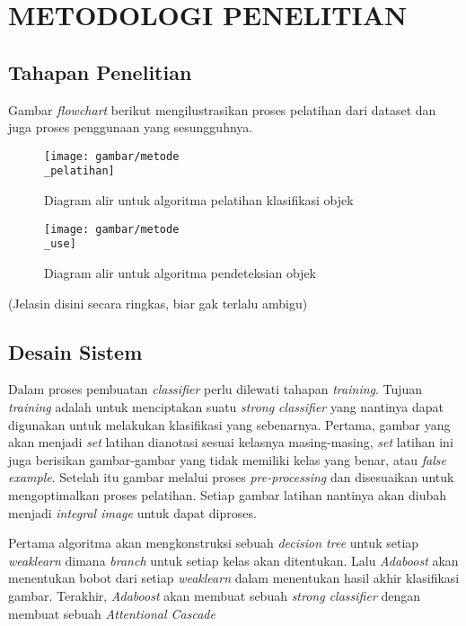 
\chapter{METODOLOGI PENELITIAN}

\section{Tahapan Penelitian}

Gambar \textit{flowchart} berikut mengilustrasikan proses pelatihan 
 dari dataset dan juga proses penggunaan yang sesungguhnya.

\begin{figure}[H]
  \centering{}
	\texttt{[image: gambar/metode\\\_pelatihan]}
  \caption{Diagram alir untuk algoritma pelatihan klasifikasi objek}
\end{figure}

\begin{figure}[H]
  \centering{}
	\texttt{[image: gambar/metode\\\_use]}
  \caption{Diagram alir untuk algoritma pendeteksian objek}
\end{figure}

(Jelasin disini secara ringkas, biar gak terlalu ambigu)

\section{Desain Sistem}

Dalam proses pembuatan \emph{classifier} perlu dilewati tahapan \textit{training}. 
Tujuan \textit{training} adalah untuk menciptakan suatu \emph{strong classifier} 
yang nantinya dapat digunakan untuk melakukan klasifikasi yang sebenarnya.
Pertama, gambar yang akan menjadi \textit{set} latihan dianotasi sesuai kelasnya masing-masing, 
\textit{set} latihan ini juga berisikan gambar-gambar yang tidak memiliki kelas yang benar, atau 
\emph{false example}. Setelah itu gambar melalui proses \emph{pre-processing} dan disesuaikan 
untuk mengoptimalkan proses pelatihan. Setiap gambar latihan nantinya akan 
diubah menjadi \emph{integral image} untuk dapat diproses.

Pertama algoritma akan mengkonstruksi sebuah \emph{decision tree} untuk setiap 
\emph{weaklearn} dimana \emph{branch} untuk setiap kelas akan ditentukan. Lalu 
\emph{Adaboost} akan menentukan bobot dari setiap \emph{weaklearn} dalam menentukan hasil akhir 
klasifikasi gambar. Terakhir, \emph{Adaboost} akan membuat sebuah 
\emph{strong classifier} dengan membuat sebuah \emph{Attentional Cascade}

